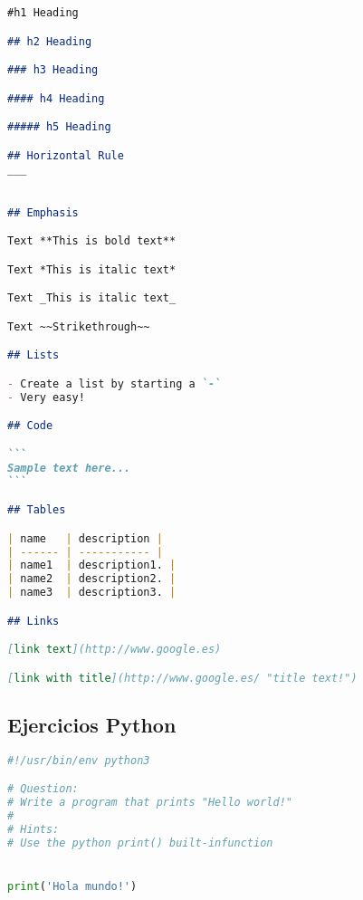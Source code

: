 \begin{lstlisting}[language=markdown,caption={exercise\_02.md},captionpos=b]
#h1 Heading

## h2 Heading

### h3 Heading

#### h4 Heading

##### h5 Heading

## Horizontal Rule
___


## Emphasis

Text **This is bold text**

Text *This is italic text*

Text _This is italic text_

Text ~~Strikethrough~~

## Lists

- Create a list by starting a `-`
- Very easy!

## Code

```
Sample text here...
```

## Tables

| name   | description |
| ------ | ----------- |
| name1  | description1. |
| name2  | description2. |
| name3  | description3. |

## Links

[link text](http://www.google.es)

[link with title](http://www.google.es/ "title text!")
\end{lstlisting}

\subsection{Ejercicios Python}
\begin{lstlisting}[language=python,caption={exercise\_1.py},captionpos=b]
#!/usr/bin/env python3

# Question:
# Write a program that prints "Hello world!"
#
# Hints:
# Use the python print() built-infunction


print('Hola mundo!')
\end{lstlisting}

